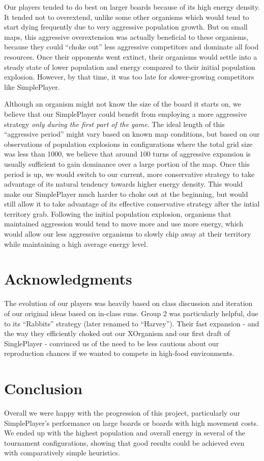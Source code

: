 \documentclass[
10pt, %
letterpaper, %
oneside, %
headinclude,footinclude, %
english
]{article}
\begin{document}
Our players tended to do best on larger boards because of its high energy density. It tended not to overextend, unlike some other organisms which would tend to start dying frequently due to very aggressive population growth. But on small maps, this aggressive overextension was actually beneficial to these organisms, because they could ``choke out'' less aggressive competitors and dominate all food resources. Once their opponents went extinct, their organisms would settle into a steady state of lower population and energy compared to their initial population explosion. However, by that time, it was too late for slower-growing competitors like SimplePlayer.

Although an organism might not know the size of the board it starts on, we believe that our SimplePlayer could benefit from employing a more aggressive strategy \textit{only during the first part of the game}. The ideal length of this ``aggressive period'' might vary based on known map conditions, but based on our observations of population explosions in configurations where the total grid size was less than 1000, we believe that around 100 turns of aggressive expansion is usually sufficient to gain dominance over a large portion of the map. Once this period is up, we would switch to our current, more conservative strategy to take advantage of its natural tendency towards higher energy density. This would make our SimplePlayer much harder to choke out at the beginning, but would still allow it to take advantage of its effective conservative strategy after the intial territory grab. Following the initial population explosion, organisms that maintained aggression would tend to move more and use more energy, which would allow our less aggressive organisms to slowly chip away at their territory while maintaining a high average energy level.

\section{Acknowledgments}

The evolution of our players was heavily based on class discussion and iteration of our original ideas based on in-class runs. Group 2 was particularly helpful, due to its ``Rabbits'' strategy (later renamed to ``Harvey''). Their fast expansion - and the way they efficiently choked out our XOrganism and our first draft of SinglePlayer - convinced us of the need to be less cautious about our reproduction chances if we wanted to compete in high-food environments.

\section{Conclusion}

Overall we were happy with the progression of this project, particularly our SimplePlayer's performance on large boards or boards with high movement costs. We ended up with the highest population and overall energy in several of the tournament configurations, showing that good results could be achieved even with comparatively simple heuristics.
\end{document}
